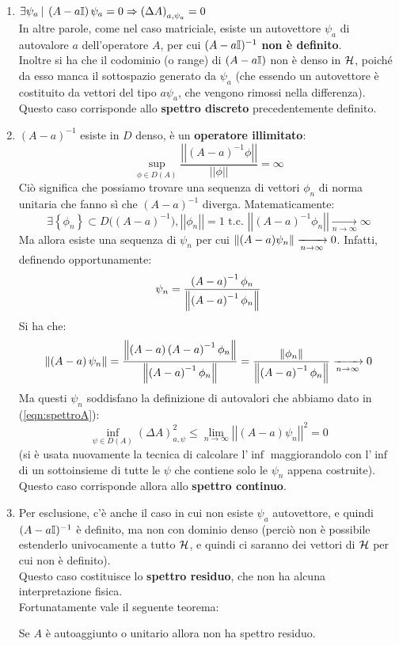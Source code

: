 \documentclass[../../FisicaTeorica.tex]{subfiles}
\begin{document}
\begin{enumerate}
    \item 
    $\displaystyle \exists  \psi_a\>|\> \left(A-a  \mathbb{I}\right)\psi_a=0\Rightarrow \left(\Delta A\right)_{a,\psi_a}=0$\\
    In altre parole, come nel caso matriciale, esiste un autovettore $\psi_a$ di autovalore $a$ dell'operatore $A$, per cui $(A-a\mathbb{I})^{-1}$ \textbf{non è definito}.\\
    Inoltre si ha che il codominio (o range) di $(A-a\mathbb{I})$  non è denso in $\mathcal{H}$, poiché da esso manca il sottospazio generato da $\psi_a$ (che essendo un autovettore è costituito da vettori del tipo $a\psi_a$, che vengono rimossi nella differenza).\\
    Questo caso corrisponde allo \textbf{spettro discreto} precedentemente definito.
	\item $\left(A-a\right)^{-1}$ esiste in $D$ denso, è un \textbf{operatore illimitato}:
	\[
	\sup_{\phi\in D\left(A\right)}{\frac{\left|\left|\left(A-a\right)^{-1}\phi\right|\right|}{\left|\left|\phi\right|\right|}}=\infty 
	\]
	Ciò significa che possiamo trovare una sequenza di vettori $\phi_n$ di norma unitaria che fanno sì che $(A-a)^{-1}$ diverga. Matematicamente: 
	\[ 
	\exists \left\{\phi_n\right\}\subset D{(\left(A-a\right)}^{-1}), \left|\left|\phi_n\right|\right|=1 \text{ t.c. }\left|\left|\left(A-a\right)^{-1}\phi_n\right|\right|\xrightarrow[n\to\infty]{} \infty
	\]
	Ma allora esiste una sequenza di  $\psi_n$ per cui $\left\lVert(A-a)\psi_n\right\rVert\xrightarrow[n\to\infty]{} 0$. Infatti, definendo opportunamente:
	\[
	\psi_n=\frac{\left(A-a\right)^{-1}\phi_n}{\left\lVert\left(A-a\right)^{-1}\phi_n\right\rVert}
	\]
	Si ha che:
	\[
	\left\lVert\left(A-a\right)\psi_n\right\rVert=\frac{\left\lVert\left(A-a\right)\left(A-a\right)^{-1}\phi_n\right\rVert}{\left\lVert\left(A-a\right)^{-1}\phi_n\right\rVert}=\frac{\left\lVert\phi_n\right\rVert}{\left\lVert\left(A-a\right)^{-1}\phi_n\right\rVert}\xrightarrow[n\to\infty]{} 0
	\]
	Ma questi $\psi_n$ soddisfano la definizione di autovalori che abbiamo dato in (\ref{eqn:spettroA}):
	\[
	\inf_{\psi\in D\left(A\right)}{\left(\Delta A\right)_{a,\psi}^2}\leq \lim_{n\rightarrow\infty}{\left|\left|\left(A-a\right)\psi_n\right|\right|^2=0}
	\]
	(si è usata nuovamente la tecnica di calcolare l'$\inf$ maggiorandolo con l'$\inf$ di un sottoinsieme di tutte le $\psi$ che contiene solo le $\psi_n$ appena costruite).\\
	Questo caso corrisponde allora allo \textbf{spettro continuo}.
	\item Per esclusione, c'è anche il caso in cui non esiste $\psi_a$ autovettore, e quindi $(A-a\mathbb{I})^{-1}$ è definito, ma non con dominio denso (perciò non è possibile estenderlo univocamente a tutto $\mathcal{H}$, e quindi ci saranno dei vettori di $\mathcal{H}$ per cui non è definito).\\
	Questo caso costituisce lo \textbf{spettro residuo}, che non ha alcuna interpretazione fisica.\\
	Fortunatamente vale il seguente teorema:
	\begin{thm}
	Se $A$ è autoaggiunto o unitario allora non ha spettro residuo.
	\end{thm}
\end{enumerate}
\end{document}
